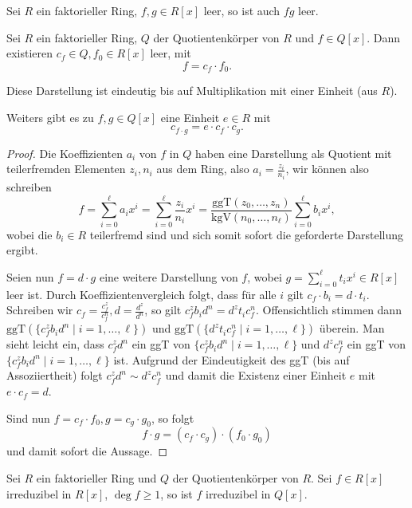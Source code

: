 \begin{corollary}
    Sei $R$ ein faktorieller Ring, $f,g \in R[x]$ leer, so ist auch $fg$ leer.
\end{corollary}

\begin{lemma} \label{lemma:poly_in_quotientenkoerper}
    Sei $R$ ein faktorieller Ring, $Q$ der Quotientenkörper von $R$ und $f \in Q[x]$. Dann existieren $c_f \in Q, f_0 \in R[x]$ leer, mit
    $$ f = c_f \cdot f_0. $$

    Diese Darstellung ist eindeutig bis auf Multiplikation mit einer Einheit (aus $R$).

    Weiters gibt es zu $f, g \in Q[x]$ eine Einheit $e \in R$ mit
    $$ c_{f \cdot g} = e \cdot c_f \cdot c_g. $$
\end{lemma}

\begin{proof}
    Die Koeffizienten $a_i$ von $f$ in $Q$ haben eine Darstellung als Quotient mit teilerfremden Elementen $z_i,n_i$ aus dem Ring, also $a_i=\frac{z_i}{n_i}$, wir können also schreiben
    $$ f = \sum_{i=0}^\ell a_i x^i = \sum_{i=0}^\ell \frac{z_i}{n_i} x^i = \frac{\mathrm{ggT}(z_0, \hdots, z_n)}{\mathrm{kgV}(n_0, \hdots, n_\ell)} \sum_{i=0}^\ell b_i x^i, $$
    wobei die $b_i \in R$ teilerfremd sind und sich somit sofort die geforderte Darstellung ergibt.

    Seien nun $f=d \cdot g$ eine weitere Darstellung von $f$, wobei $g=\sum_{i=0}^\ell t_ix^i\in R[x]$ leer ist. 
    Durch Koeffizientenvergleich folgt, dass für alle $i$ gilt $c_f \cdot b_i = d \cdot t_i$. Schreiben wir $c_f = \frac{c_f^z}{c_f^n}, d = \frac{d^z}{d^n}$, so gilt $c_f^z b_i d^n = d^z t_i c_f^n$. Offensichtlich stimmen dann $\mathrm{ggT}(\{c_f^zb_id^n\mid i=1,\ldots,\ell\})$ und $\mathrm{ggT}(\{d^zt_ic_f^n\mid i=1,\ldots,\ell\})$ überein. Man sieht leicht ein, dass $c_f^zd^n$ ein ggT von $\{c_f^zb_id^n\mid i=1,\ldots,\ell\}$ und $d^zc_f^n$ ein ggT von $\{c_f^zb_id^n\mid i=1,\ldots,\ell\}$ ist. Aufgrund der Eindeutigkeit des ggT (bis auf Assoziiertheit) folgt $c_f^z d^n \sim d^z c_f^n$ und damit die Existenz einer Einheit $e$ mit $e \cdot c_f = d$.

    Sind nun $f = c_f \cdot f_0, g = c_g \cdot g_0$, so folgt
    $$ f \cdot g = (c_f \cdot c_g) \cdot (f_0 \cdot g_0) $$
    und damit sofort die Aussage.
\end{proof}

\begin{lemma} \label{lemma:irreduzibel-quotientenkoerper}
    Sei $R$ ein faktorieller Ring und $Q$ der Quotientenkörper von $R$. Sei $f \in R[x]$ irreduzibel in $R[x]$, $\deg f \geq 1$, so ist $f$ irreduzibel in $Q[x]$.
\end{lemma}

